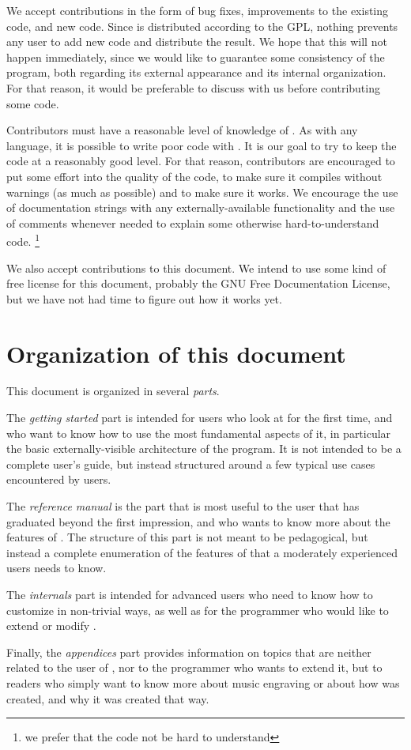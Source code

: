 We accept contributions in the form of bug fixes, improvements to the
existing code, and new code.  Since {\gs} is distributed according to
the GPL, nothing prevents any user to add new code and distribute the
result.  We hope that this will not happen immediately, since we would
like to guarantee some consistency of the program, both regarding its
external appearance and its internal organization.  For that reason,
it would be preferable to discuss with us before contributing some
code. 

Contributors must have a reasonable level of knowledge of {\commonlisp}.  As
with any language, it is possible to write poor code with {\commonlisp}.  It
is our goal to try to keep the code at a reasonably good level.  For
that reason, contributors are encouraged to put some effort into the
quality of the code, to make sure it compiles without warnings (as
much as possible) and to make sure it works.  We encourage the use of
documentation strings with any externally-available functionality and
the use of comments whenever needed to explain some otherwise
hard-to-understand code. \footnote{we prefer that the code not be hard
  to understand}

We also accept contributions to this document.  We intend to use some
kind of free license for this document, probably the GNU Free
Documentation License, but we have not had time to figure out how it
works yet. 
\section{Organization of this document}

This document is organized in several \emph{parts}.  

The \emph{getting started} part is intended for users who look at
{\gs} for the first time, and who want to know how to use the most
fundamental aspects of it, in particular the basic externally-visible
architecture of the program.  It is not intended to be a complete
user's guide, but instead structured around a few typical use cases
encountered by users.

The \emph{reference manual} is the part that is most useful to the
user that has graduated beyond the first impression, and who wants to
know more about the features of {\gs}.  The structure of this part is
not meant to be pedagogical, but instead a complete enumeration of the
features of {\gs} that a moderately experienced users needs to know. 

The \emph{internals} part is intended for advanced users who need to
know how to customize {\gs} in non-trivial ways, as well as for the
programmer who would like to extend or modify {\gs}.

Finally, the \emph{appendices} part provides information on topics
that are neither related to the user of {\gs}, nor to the programmer
who wants to extend it, but to readers who simply want to know more
about music engraving or about how {\gs} was created, and why it was
created that way. 

